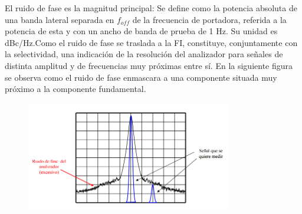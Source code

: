 \documentclass[a4paper,12pt,twoside]{article}
\begin{document}
El ruido de fase es la magnitud principal:
Se define como la potencia absoluta de una banda lateral separada en $f_{off}$ de la
frecuencia de portadora, referida a la potencia de esta y con un ancho de banda
de prueba de 1 Hz. Su unidad es dBc/Hz.Como el ruido de fase se traslada a la FI,
constituye, conjuntamente con la selectividad, una indicación de la
resolución del analizador para señales de distinta amplitud y de frecuencias muy
próximas entre sí.
En la siguiente figura se observa como el ruido de fase enmascara a una componente
situada muy próximo a la componente fundamental. 

\begin{figure}[H]
    \centering
    \includegraphics[width=0.8\textwidth]{../img/ruido_de_fase.png}
\end{figure}
\end{document}
